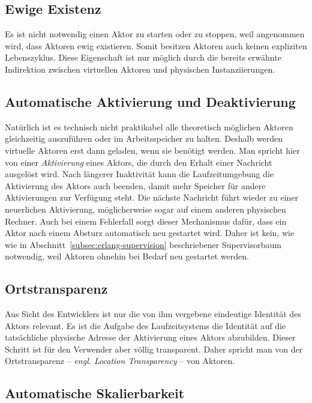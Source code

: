 \subsection{Ewige Existenz}

Es ist nicht notwendig einen Aktor zu starten oder zu stoppen, weil angenommen wird, dass Aktoren ewig existieren. Somit besitzen Aktoren auch keinen expliziten Lebenszyklus. Diese Eigenschaft ist nur möglich durch die bereits erwähnte Indirektion zwischen virtuellen Aktoren und physischen Instanziierungen.

\subsection{Automatische Aktivierung und Deaktivierung}

Natürlich ist es technisch nicht praktikabel alle theoretisch möglichen Aktoren gleichzeitig auszuführen oder im Arbeitsspeicher zu halten. Deshalb werden virtuelle Aktoren erst dann geladen, wenn sie benötigt werden. Man spricht hier von einer \textit{Aktivierung} eines Aktors, die \zB durch den Erhalt einer Nachricht ausgelöst wird. Nach längerer Inaktivität kann die Laufzeitumgebung die Aktivierung des Aktors auch beenden, damit mehr Speicher für andere Aktivierungen zur Verfügung steht. Die nächste Nachricht führt wieder zu einer neuerlichen Aktivierung, möglicherweise sogar auf einem anderen physischen Rechner. Auch bei einem Fehlerfall sorgt dieser Mechanismus dafür, dass ein Aktor nach einem Absturz automatisch neu gestartet wird. Daher ist kein, wie wie in Abschnitt~\ref{subsec:erlang-supervision} beschriebener Supervisorbaum notwendig, weil Aktoren ohnehin bei Bedarf neu gestartet werden.

\subsection{Ortstransparenz}

Aus Sicht des Entwicklers ist nur die von ihm vergebene eindeutige Identität des Aktors relevant. Es ist die Aufgabe des Laufzeitsystems die Identität auf die tatsächliche physische Adresse der Aktivierung eines Aktors abzubilden. Dieser Schritt ist für den Verwender aber völlig transparent. Daher spricht man von der Ortstransparenz -- \textit{engl. Location Transparency} -- von Aktoren.

\subsection{Automatische Skalierbarkeit}

